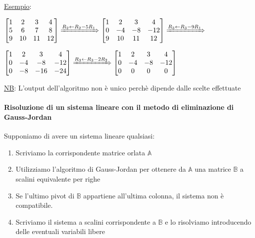 \documentclass{article}
\newcommand{\ul}[1]{\underline{#1}}
\newcommand{\A}{\mathbb{A}}
\newcommand{\B}{\mathbb{B}}
\begin{document}
\ul{Esempio}:

$\begin{bmatrix}
	1 & 2  & 3  & 4  \\
	5 & 6  & 7  & 8  \\
	9 & 10 & 11 & 12
\end{bmatrix}\xRightarrow{R_2\leftarrow R_2-5R_1}
\begin{bmatrix}
	1 & 2  & 3  & 4   \\
	0 & -4 & -8 & -12 \\
	9 & 10 & 11 & 12
\end{bmatrix}\xRightarrow{R_3\leftarrow R_3-9R_1}$

$\begin{bmatrix}
	1 & 2  & 3   & 4   \\
	0 & -4 & -8  & -12 \\
	0 & -8 & -16 & -24
\end{bmatrix}\xRightarrow{R_3\leftarrow R_3-2R_2}
\begin{bmatrix}
	1 & 2  & 3  & 4   \\
	0 & -4 & -8 & -12 \\
	0 & 0  & 0  & 0
\end{bmatrix}$

\ul{NB}: L'output dell'algoritmo non è unico perchè dipende dalle scelte effettuate

\paragraph*{Risoluzione di un sistema lineare con il metodo di eliminazione di Gauss-Jordan}

Supponiamo di avere un sistema lineare qualsiasi:

\begin{enumerate}
	\item Scriviamo la corrispondente matrice orlata $\A$
	\item Utilizziamo l'algoritmo di Gauss-Jordan per ottenere da $\A$ una matrice $\B$ a scalini equivalente per righe
	\item Se l'ultimo pivot di $\B$ appartiene all'ultima colonna, il sistema non è compatibile.
	\item Scriviamo il sistema a scalini corrispondente a $\B$ e lo risolviamo introducendo delle eventuali variabili libere
\end{enumerate}
\end{document}

